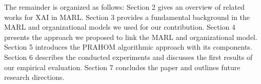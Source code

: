 \documentclass[doubleblind]{ecai}
\newtheorem{theorem}{Theorem}
\newcounter{proof}
\renewcommand{\theproof}{\arabic{proof}}
\renewenvironment{proof}[1][]{
    \refstepcounter{proof}
    \noindent \raggedright \textit{\textbf{Proof. \theproof}}

    \setlength{\leftskip}{1em}

}
{

\
\setlength{\leftskip}{0pt}
}
\begin{document}

The remainder is organized as follows: Section 2 gives an overview of related works for XAI in MARL. Section 3 provides a fundamental background in the MARL and organizational models we used for our contribution. Section 4 presents the approach we proposed to link the MARL and organizational model. Section 5 introduces the PRAHOM algorithmic approach with its components. Section 6 describes the conducted experiments and discusses the first results of our empirical evaluation. Section 7 concludes the paper and outlines future research directions.





\end{document}
